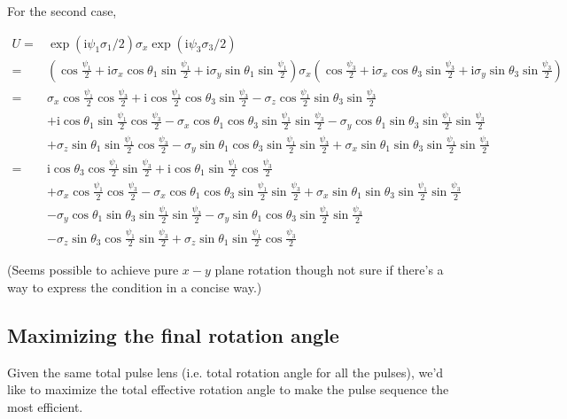 \documentclass[10pt,fleqn]{article}
\newcommand{\ui}{\mathrm{i}}
\newcommand{\eqar}[1]
{
  \begin{align*}
    #1
  \end{align*}
}
\newcommand{\paren}[1]{{\left({#1}\right)}}
\begin{document}
For the second case,
\eqar{
  U=&\exp\paren{\ui\psi_1\sigma_1/2}\sigma_x\exp\paren{\ui\psi_3\sigma_3/2}\\
  =&\paren{\cos\frac{\psi_1}{2}+\ui\sigma_x\cos\theta_1\sin\frac{\psi_1}{2}+\ui\sigma_y\sin\theta_1\sin\frac{\psi_1}{2}}\sigma_x\paren{\cos\frac{\psi_3}{2}+\ui\sigma_x\cos\theta_3\sin\frac{\psi_3}{2}+\ui\sigma_y\sin\theta_3\sin\frac{\psi_3}{2}}\\
  =&\sigma_x\cos\frac{\psi_1}{2}\cos\frac{\psi_3}{2}+\ui\cos\frac{\psi_1}{2}\cos\theta_3\sin\frac{\psi_3}{2}-\sigma_z\cos\frac{\psi_1}{2}\sin\theta_3\sin\frac{\psi_3}{2}\\
  &+\ui\cos\theta_1\sin\frac{\psi_1}{2}\cos\frac{\psi_3}{2}-\sigma_x\cos\theta_1\cos\theta_3\sin\frac{\psi_1}{2}\sin\frac{\psi_3}{2}-\sigma_y\cos\theta_1\sin\theta_3\sin\frac{\psi_1}{2}\sin\frac{\psi_3}{2}\\
  &+\sigma_z\sin\theta_1\sin\frac{\psi_1}{2}\cos\frac{\psi_3}{2}-\sigma_y\sin\theta_1\cos\theta_3\sin\frac{\psi_1}{2}\sin\frac{\psi_3}{2}+\sigma_x\sin\theta_1\sin\theta_3\sin\frac{\psi_1}{2}\sin\frac{\psi_3}{2}\\
  =&\ui\cos\theta_3\cos\frac{\psi_1}{2}\sin\frac{\psi_3}{2}+\ui\cos\theta_1\sin\frac{\psi_1}{2}\cos\frac{\psi_3}{2}\\
  &+\sigma_x\cos\frac{\psi_1}{2}\cos\frac{\psi_3}{2}-\sigma_x\cos\theta_1\cos\theta_3\sin\frac{\psi_1}{2}\sin\frac{\psi_3}{2}+\sigma_x\sin\theta_1\sin\theta_3\sin\frac{\psi_1}{2}\sin\frac{\psi_3}{2}\\
  &-\sigma_y\cos\theta_1\sin\theta_3\sin\frac{\psi_1}{2}\sin\frac{\psi_3}{2}-\sigma_y\sin\theta_1\cos\theta_3\sin\frac{\psi_1}{2}\sin\frac{\psi_3}{2}\\
  &-\sigma_z\sin\theta_3\cos\frac{\psi_1}{2}\sin\frac{\psi_3}{2}+\sigma_z\sin\theta_1\sin\frac{\psi_1}{2}\cos\frac{\psi_3}{2}
}
(Seems possible to achieve pure $x-y$ plane rotation though not sure if there's a way
to express the condition in a concise way.)

\subsection{Maximizing the final rotation angle}
Given the same total pulse lens (i.e. total rotation angle for all the pulses),
we'd like to maximize the total effective rotation angle to make the pulse sequence
the most efficient.\\
\end{document}
